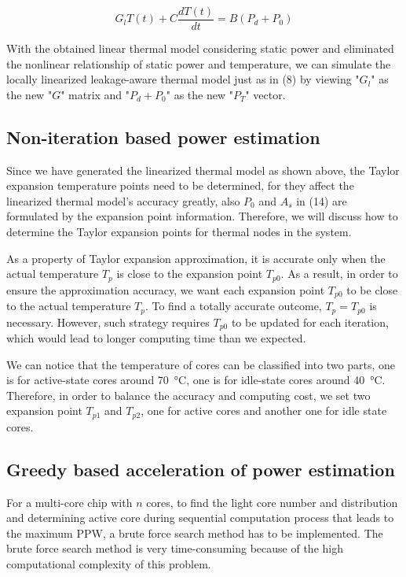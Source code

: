 \begin{equation}\label{gt=bp}
G_{l}T(t) + C\frac{dT(t)}{dt} = B(P_{d} + P_{0})
\end{equation}

With the obtained linear thermal model considering static power and eliminated the nonlinear relationship of static power and temperature, we can simulate the locally linearized leakage-aware thermal model just as in (8) by viewing "$G_{l}$" as the new "$G$" matrix and "$P_{d} + P_{0}$" as the new "$P_{T}$" vector.

\subsection{Non-iteration based power estimation}
Since we have generated the linearized thermal model as shown above, the Taylor expansion temperature points need to be determined, for they affect the linearized thermal model's accuracy greatly, also $P_{0}$ and $A_{s}$ in (14) are formulated by the expansion point information. Therefore, we will discuss how to determine the Taylor expansion points for thermal nodes in the system. 

As a property of Taylor expansion approximation, it is accurate only when the actual temperature $T_{p}$ is close to the expansion point $T_{p0}$. As a result, in order to ensure the approximation accuracy, we want each expansion point $T_{p0}$ to be close to the actual temperature $T_{p}$. To find a totally accurate outcome, $T_{p} = T_{p0}$ is necessary. However, such strategy requires $T_{p0}$ to be updated for each iteration, which would lead to longer computing time than we expected.

We can notice that the temperature of cores can be classified into two parts, one is for active-state cores around \SI{70}{\degreeCelsius}, one is for idle-state cores around \SI{40}{\degreeCelsius}. Therefore, in order to balance the accuracy and computing cost, we set two expansion point $T_{p1}$ and $T_{p2}$, one for active cores and another one for idle state cores.

\subsection{Greedy based acceleration of power estimation}
For a multi-core chip with $n$ cores, to find the light core number and distribution and determining active core during sequential computation process that leads to the maximum PPW, a brute force search method has to be implemented. The brute force search method is very time-consuming because of the high computational complexity of this problem.


